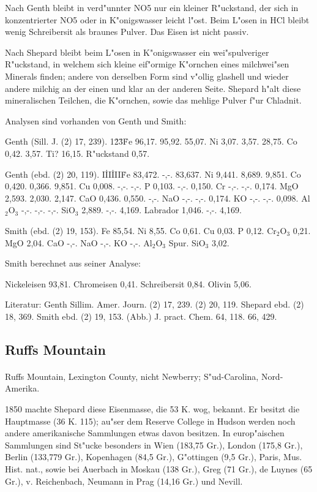 \documentclass[a4paper, 11pt, oneside]{article}
\begin{document}
Nach Genth bleibt in verd"unnter NO5 nur ein kleiner R"uckstand, der sich in konzentrierter NO5 oder in K"onigswasser leicht l"ost. Beim L"osen in HCl bleibt wenig Schreibersit als braunes Pulver. Das Eisen ist nicht passiv.

Nach Shepard bleibt beim L"osen in K"onigswasser ein wei"spulveriger R"uckstand, in welchem sich kleine eif"ormige K"ornchen eines milchwei"sen Minerals finden; andere von derselben Form sind v"ollig glashell und wieder andere milchig an der einen und klar an der anderen Seite. Shepard h"alt diese mineralischen Teilchen, die K"ornchen, sowie das mehlige Pulver f"ur Chladnit.

Analysen sind vorhanden von Genth und Smith:

Genth (Sill. J. (2) 17, 239).  
1\. 2\. 3\.  
Fe 96,17. 95,92. 55,07.  
Ni 3,07. 3,57. 28,75.  
Co 0,42. 3,57. Ti? 16,15. 
R"uckstand 0,57.

Genth (ebd. (2) 20, 119).
I\. II\. III\.  
Fe 83,472. -,-. 83,637.  
Ni 9,441. 8,689. 9,851.  
Co 0,420. 0,366. 9,851.  
Cu 0,008. -,-. -,-.  
P 0,103. -,-. 0,150.  
Cr -,-. -,-. 0,174.  
MgO 2,593. 2,030. 2,147.  
CaO 0,436. 0,550. -,-.  
NaO -,-. -,-. 0,174.  
KO -,-. -,-. 0,098.  
Al$_{2}$O$_{3}$ -,-. -,-. -,-.  
SiO$_{3}$ 2,889. -,-. 4,169.  
Labrador 1,046. -,-. 4,169.

Smith (ebd. (2) 19, 153).  
Fe 85,54.  
Ni 8,55.  
Co 0,61.  
Cu 0,03.  
P 0,12.  
Cr$_{2}$O$_{3}$ 0,21.  
MgO 2,04.  
CaO -,-.  
NaO -,-.  
KO -,-.  
Al$_{2}$O$_{3}$ Spur.  
SiO$_{3}$ 3,02.  

Smith berechnet aus seiner Analyse:

Nickeleisen 93,81.  
Chromeisen 0,41.  
Schreibersit 0,84.  
Olivin 5,06.

Literatur: Genth Sillim. Amer. Journ. (2) 17, 239. (2) 20, 119. Shepard ebd. (2) 18, 369. Smith ebd. (2) 19, 153. (Abb.) J. pract. Chem. 64, 118. 66, 429.

\subsection{Ruffs Mountain}
\normalsize
\paragraph{}
Ruffs Mountain, Lexington County, nicht Newberry; S"ud-Carolina, Nord-Amerika.

1850 machte Shepard diese Eisenmasse, die 53 K. wog, bekannt. Er besitzt die Hauptmasse (36 K. 115); au"ser dem Reserve College in Hudson werden noch andere amerikanische Sammlungen etwas davon besitzen. In europ"aischen Sammlungen sind St"ucke besonders in Wien (183,75 Gr.), London (175,8 Gr.), Berlin (133,779 Gr.), Kopenhagen (84,5 Gr.), G"ottingen (9,5 Gr.), Paris, Mus. Hist. nat., sowie bei Auerbach in Moskau (138 Gr.), Greg (71 Gr.), de Luynes (65 Gr.), v. Reichenbach, Neumann in Prag (14,16 Gr.) und Nevill.
\end{document}
